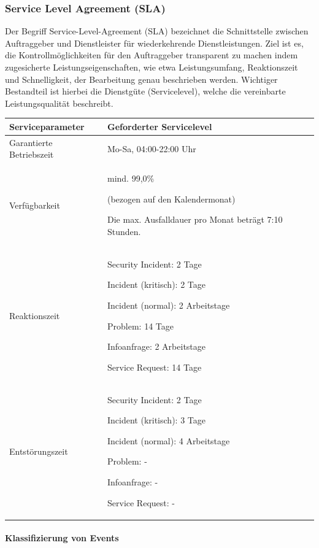 \documentclass[]{article}
\let\oldparagraph\paragraph
\renewcommand{\paragraph}[1]{\oldparagraph{#1}\mbox{}}
\begin{document}
\subsubsection{\texorpdfstring{\protect\hypertarget{ux5fRef456699502}{}{\protect\hypertarget{ux5fToc457467702}{}{}}Service
Level Agreement
(SLA)}{Service Level Agreement (SLA)}}\label{service-level-agreement-sla}

Der Begriff Service-Level-Agreement (SLA) bezeichnet die Schnittstelle
zwischen Auftraggeber und Dienstleister für wiederkehrende
Dienstleistungen. Ziel ist es, die Kontrollmöglichkeiten für den
Auftraggeber transparent zu machen indem zugesicherte
Leistungseigenschaften, wie etwa Leistungsumfang, Reaktionszeit und
Schnelligkeit, der Bearbeitung genau beschrieben werden. Wichtiger
Bestandteil ist hierbei die Dienstgüte (Servicelevel), welche die
vereinbarte Leistungsqualität beschreibt.

\begin{longtable}{lp{6cm}}
\toprule
Serviceparameter & Geforderter Servicelevel\tabularnewline
\midrule
\protect\hypertarget{GarantierteBetriebszeit}{}{}Garantierte
Betriebszeit & Mo-Sa, 04:00-22:00 Uhr\tabularnewline
Verfügbarkeit & mind. 99,0\%

(bezogen auf den Kalendermonat)

Die max. Ausfalldauer pro Monat beträgt 7:10 Stunden.\tabularnewline
Reaktionszeit & Security Incident: 2 Tage

Incident (kritisch): 2 Tage

Incident (normal): 2 Arbeitstage

Problem: 14 Tage

Infoanfrage: 2 Arbeitstage

Service Request: 14 Tage\tabularnewline
Entstörungszeit & Security Incident: 2 Tage

Incident (kritisch): 3 Tage

Incident (normal): 4 Arbeitstage

Problem: -

Infoanfrage: -

Service Request: -\tabularnewline
\bottomrule
\end{longtable}

\paragraph{Klassifizierung von Events}\label{klassifizierung-von-events}
\end{document}
